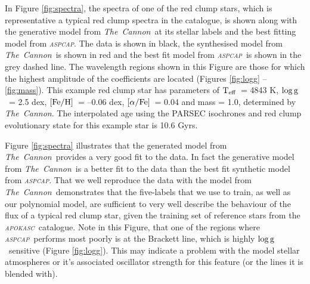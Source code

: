 \documentclass[12pt, preprint]{aastex}
\newcommand{\project}[1]{\textsl{#1}}
\newcommand{\tc}{\project{The~Cannon}}
\newcommand{\apokasc}{\project{\textsc{apokasc}}}
\newcommand{\aspcap}{\project{\textsc{aspcap}}}
\newcommand{\teff}{\mbox{$\rm T_{eff}$}}
\newcommand{\feh}{\mbox{$\rm [Fe/H]$}}
\newcommand{\alphafe}{\mbox{$\rm [\alpha/Fe]$}}
\newcommand{\logg}{\mbox{$\rm \log g$}}
\begin{document}
In Figure \ref{fig:spectra}, the spectra of one of the red clump stars, which is representative a typical red clump spectra in the catalogue, is shown along with the generative model from \tc\ at its stellar labels and the best fitting model from \aspcap. The data is shown in black, the synthesised model from \tc\ is shown in red and the best fit model from \aspcap\ is shown in the grey dashed line. The wavelength regions shown in this Figure are those for which the highest amplitude of the coefficients are located (Figures \ref{fig:logg} -- \ref{fig:mass}).  This example red clump star has parameters of \teff\ = 4843 K, \logg\ = 2.5 dex, \feh\ = --0.06 dex, \alphafe\ = 0.04 and mass = 1.0, determined by \tc. The interpolated age using the PARSEC isochrones and red clump evolutionary state for this example star is 10.6 Gyrs. 

Figure \ref{fig:spectra} illustrates that the generated model from \tc\ provides a very good fit to the data. In fact the generative model from \tc\ is a better fit to the data than the best fit synthetic model from \aspcap. That we well reproduce the data with the model from \tc\ demonstrates that the five-labels that we use to train, as well as our polynomial model, are sufficient to very well describe the behaviour of the flux of a typical red clump star, given the training set of reference stars from the \apokasc\ catalogue. Note in this Figure, that one of the regions where \aspcap\ performs most poorly is  at the Brackett line, which is highly \logg\ sensitive (Figure \ref{fig:logg}). This may indicate a problem with the model stellar atmospheres or it's associated oscillator strength for this feature (or the lines it is blended with). 
\end{document}

